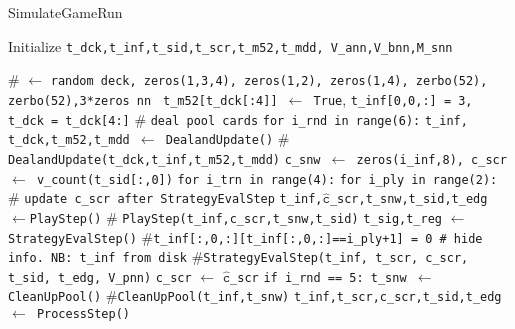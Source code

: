 \documentclass{article}
\newcommand{\py}[1]{\texttt{#1}}
\begin{document}
\begin{algorithm}
\caption{SimulateGameRun}
\label{alg:your_algorithm}
\begin{algorithmic}[1]
\State Initialize \py{t\_dck,t\_inf,t\_sid,t\_scr,t\_m52,t\_mdd, V\_ann,V\_bnn,M\_snn}

\Statex \textcolor{green!50!black}{\scriptsize\# 
$\gets$ \py{random deck, zeros(1,3,4), zeros(1,2), zeros(1,4), zerbo(52), zerbo(52),3*zeros nn }}
\State \py{t\_m52[t\_dck[:4]] $\gets$ True}, \py{t\_inf[0,0,:] = 3, t\_dck = t\_dck[4:]}
\Statex \textcolor{green!50!black}{\scriptsize\#
\py{deal pool cards}}
\vspace{0.2em}
\State\py{for i\_rnd in range(6):}
\vspace{0.5em}
\State \hspace*{1em}\py{t\_inf, t\_dck,t\_m52,t\_mdd $\gets$ DealandUpdate()}
\Statex \hspace*{1em}\textcolor{green!50!black}{\scriptsize\# \py{DealandUpdate(t\_dck,t\_inf,t\_m52,t\_mdd)}}
\vspace{0.2em}
\State \hspace*{1em}\py{c\_snw $\gets$ zeros(i\_inf,8), c\_scr $\gets$ v\_count(t\_sid[:,0])}
\vspace{0.2em}
\State \hspace*{1em}\py{for i\_trn in range(4):}
\State \hspace*{2em}\py{for i\_ply in range(2):}
\vspace{0.5em}
\Statex \hspace*{3em}\textcolor{green!50!black}{\scriptsize\# \py{update c\_scr after StrategyEvalStep}}
\State \hspace*{3em}\py{t\_inf,$\hat{\py{c}}$\_scr,t\_snw,t\_sid,t\_edg} $\gets$\py{PlayStep()}
\Statex \hspace*{3em}\textcolor{green!50!black}{\scriptsize\# \py{PlayStep(t\_inf,c\_scr,t\_snw,t\_sid)}}
\State \hspace*{3em}\py{t\_sig,t\_reg} $\gets$ \py{StrategyEvalStep()}
\Statex \hspace*{3em}\textcolor{green!50!black}{\scriptsize\#\py{t\_inf[:,0,:][t\_inf[:,0,:]==i\_ply+1] = 0 \# hide info. NB: t\_inf from disk}}
\Statex \hspace*{3em}\textcolor{green!50!black}{\scriptsize\#\py{StrategyEvalStep(t\_inf, t\_scr, c\_scr, t\_sid, t\_edg, V\_pnn)}}
\State \hspace*{3em}\py{c\_scr} $\gets$ \py{$\hat{\py{c}}$\_scr}
\vspace{0.2em}
\State \hspace*{1em}\py{if i\_rnd == 5: t\_snw $\gets$ CleanUpPool()}
\Statex \hspace*{1em}\textcolor{green!50!black}{\scriptsize\#\py{CleanUpPool(t\_inf,t\_snw)}}
\State  \hspace*{1em}\py{t\_inf,t\_scr,c\_scr,t\_sid,t\_edg $\gets$ ProcessStep()}

\end{algorithmic}
\end{algorithm}
\end{document}
